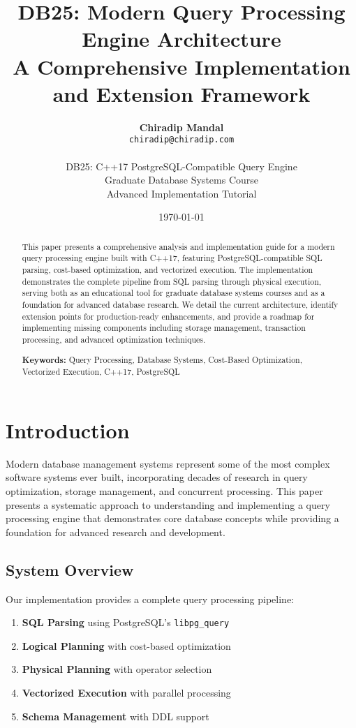 \documentclass[12pt,a4paper]{article}
\title{\textbf{DB25: Modern Query Processing Engine Architecture \\
A Comprehensive Implementation and Extension Framework}}
\author{
    \textbf{Chiradip Mandal} \\
    \texttt{chiradip@chiradip.com} \\
    \\
    DB25: C++17 PostgreSQL-Compatible Query Engine \\
    Graduate Database Systems Course \\
    Advanced Implementation Tutorial
}
\date{\today}
\begin{document}
    \maketitle

    \begin{abstract}
        This paper presents a comprehensive analysis and implementation guide for a modern query processing engine built with C++17, featuring PostgreSQL-compatible SQL parsing, cost-based optimization, and vectorized execution. The implementation demonstrates the complete pipeline from SQL parsing through physical execution, serving both as an educational tool for graduate database systems courses and as a foundation for advanced database research. We detail the current architecture, identify extension points for production-ready enhancements, and provide a roadmap for implementing missing components including storage management, transaction processing, and advanced optimization techniques.

        \textbf{Keywords:} Query Processing, Database Systems, Cost-Based Optimization, Vectorized Execution, C++17, PostgreSQL
    \end{abstract}

    \tableofcontents
    \newpage

    \section{Introduction}

    Modern database management systems represent some of the most complex software systems ever built, incorporating decades of research in query optimization, storage management, and concurrent processing. This paper presents a systematic approach to understanding and implementing a query processing engine that demonstrates core database concepts while providing a foundation for advanced research and development.

    \subsection{System Overview}

    Our implementation provides a complete query processing pipeline:

    \begin{enumerate}
        \item \textbf{SQL Parsing} using PostgreSQL's \texttt{libpg\_query}
        \item \textbf{Logical Planning} with cost-based optimization
        \item \textbf{Physical Planning} with operator selection
        \item \textbf{Vectorized Execution} with parallel processing
        \item \textbf{Schema Management} with DDL support
    \end{enumerate}
\end{document}
